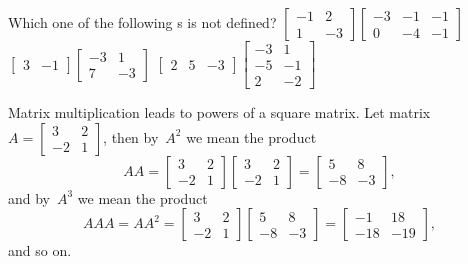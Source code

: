 \begin{activity}
Which one of the following s is not defined?
{\(\begin{bmatrix} -1&2
\\1&-3 \end{bmatrix}\begin{bmatrix} -3&-1&-1
\\0&-4&-1 \end{bmatrix}\)}
{\(\begin{bmatrix} 3&-1 \end{bmatrix}\begin{bmatrix} -3&1
\\7&-3 \end{bmatrix}\)}
{\(\begin{bmatrix} 2&5&-3 \end{bmatrix}\begin{bmatrix} -3&1
\\-5&-1
\\2&-2 \end{bmatrix}\)}
\end{activity}




\begin{example} 
Matrix multiplication leads to powers of a square matrix.
Let matrix
\(A=\begin{bmatrix} 3&2\\-2&1 \end{bmatrix}\),
then by~\(A^2\) we mean the product
\begin{equation*}
AA=\begin{bmatrix} 3&2\\-2&1 \end{bmatrix}\begin{bmatrix} 3&2\\-2&1 \end{bmatrix}=\begin{bmatrix} 5&8\\-8&-3 \end{bmatrix},
\end{equation*}
and by~\(A^3\) we mean the product
\begin{equation*}
AAA=AA^2=\begin{bmatrix} 3&2\\-2&1 \end{bmatrix}
\begin{bmatrix} 5&8\\-8&-3 \end{bmatrix}
=\begin{bmatrix} -1&18\\-18&-19 \end{bmatrix},
\end{equation*}
and so on.
\end{example}

